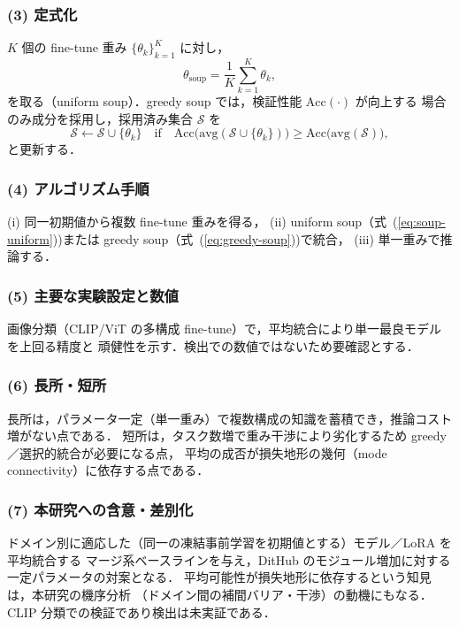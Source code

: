 \subsubsection*{(3) 定式化}
$K$ 個の fine-tune 重み $\{\theta_k\}_{k=1}^{K}$ に対し，
\begin{equation}
\theta_{\mathrm{soup}} = \frac{1}{K}\sum_{k=1}^{K}\theta_k,
\label{eq:soup-uniform}
\end{equation}
を取る（uniform soup）．greedy soup では，検証性能 $\mathrm{Acc}(\cdot)$ が向上する
場合のみ成分を採用し，採用済み集合 $\mathcal{S}$ を
\begin{equation}
\mathcal{S} \leftarrow \mathcal{S} \cup \{\theta_k\}
\quad\text{if}\quad
\mathrm{Acc}\!\bigl(\mathrm{avg}(\mathcal{S}\cup\{\theta_k\})\bigr)
\geq \mathrm{Acc}\!\bigl(\mathrm{avg}(\mathcal{S})\bigr),
\label{eq:greedy-soup}
\end{equation}
と更新する．

\subsubsection*{(4) アルゴリズム手順}
(i) 同一初期値から複数 fine-tune 重みを得る，
(ii) uniform soup（式~(\ref{eq:soup-uniform}))または greedy soup（式~(\ref{eq:greedy-soup}))で統合，
(iii) 単一重みで推論する．

\subsubsection*{(5) 主要な実験設定と数値}
画像分類（CLIP/ViT の多構成 fine-tune）で，平均統合により単一最良モデルを上回る精度と
頑健性を示す．検出での数値ではないため要確認とする．

\subsubsection*{(6) 長所・短所}
長所は，パラメータ一定（単一重み）で複数構成の知識を蓄積でき，推論コスト増がない点である．
短所は，タスク数増で重み干渉により劣化するため greedy／選択的統合が必要になる点，
平均の成否が損失地形の幾何（mode connectivity）に依存する点である．

\subsubsection*{(7) 本研究への含意・差別化}
ドメイン別に適応した（同一の凍結事前学習を初期値とする）モデル／LoRA を平均統合する
マージ系ベースラインを与え，DitHub のモジュール増加に対する一定パラメータの対案となる．
平均可能性が損失地形に依存するという知見は，本研究の機序分析
（ドメイン間の補間バリア・干渉）の動機にもなる．CLIP 分類での検証であり検出は未実証である．

